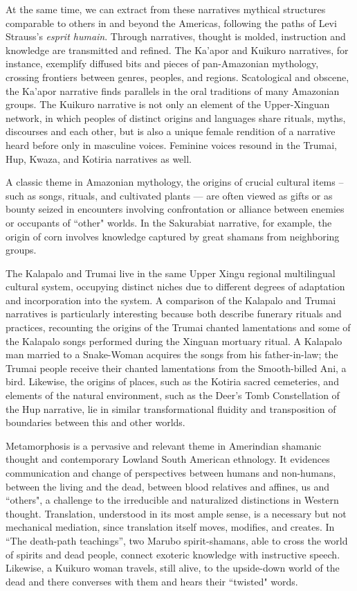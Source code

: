 \documentclass[output=paper,
modfonts,nonflat
]{langsci/langscibook}
\begin{document}
At the same time, we can extract from these narratives mythical structures comparable to others in and beyond the Americas, following the paths of Levi Strauss’s \textit{esprit humain}. Through narratives, thought is molded, instruction and knowledge are transmitted and refined.  The Ka’apor and Kuikuro narratives, for instance, exemplify diffused bits and pieces of pan-Amazonian mythology, crossing frontiers between genres, peoples, and regions. Scatological and obscene, the Ka’apor narrative finds parallels in the oral traditions of many Amazonian groups. The Kuikuro narrative is not only an element of the Upper-Xinguan network, in which peoples of distinct origins and languages share rituals, myths, discourses and each other, but is also a unique female rendition of a narrative heard before only in masculine voices. Feminine voices resound in the Trumai, Hup, Kwaza, and Kotiria narratives as well.
    
A classic theme in Amazonian mythology, the origins of crucial cultural items – such as songs, rituals, and cultivated plants — are often viewed as gifts or as bounty seized in encounters involving confrontation or alliance between enemies or occupants of “other" worlds. In the Sakurabiat narrative, for example, the origin of corn involves knowledge captured by great shamans from neighboring groups. 
    
The Kalapalo and Trumai live in the same Upper Xingu regional multilingual cultural system, occupying distinct niches due to different degrees of adaptation and incorporation into the system. A comparison of the Kalapalo and Trumai narratives is particularly interesting because both describe funerary rituals and practices, recounting the origins of the Trumai chanted lamentations and some of the Kalapalo songs performed during the Xinguan mortuary ritual. A Kalapalo man married to a Snake-Woman acquires the songs from his father-in-law; the Trumai people receive their chanted lamentations from the Smooth-billed Ani, a bird. Likewise, the origins of places, such as the Kotiria sacred cemeteries, and elements of the natural environment, such as the Deer’s Tomb Constellation of the Hup narrative, lie in similar transformational fluidity and transposition of boundaries between this and other worlds.
    
Metamorphosis is a pervasive and relevant theme in Amerindian shamanic thought and contemporary Lowland South American ethnology.  It evidences communication and change of perspectives between humans and non-humans, between the living and the dead, between blood relatives and affines, us and “others", a challenge to the irreducible and naturalized distinctions in Western thought. Translation, understood in its most ample sense, is a necessary but not mechanical mediation, since translation itself moves, modifies, and creates. In “The death-path teachings”, two Marubo spirit-shamans, able to cross the world of spirits and dead people, connect exoteric knowledge with instructive speech. Likewise, a Kuikuro woman travels, still alive, to the upside-down world of the dead and there converses with them and hears their “twisted" words. 
    
\end{document}
